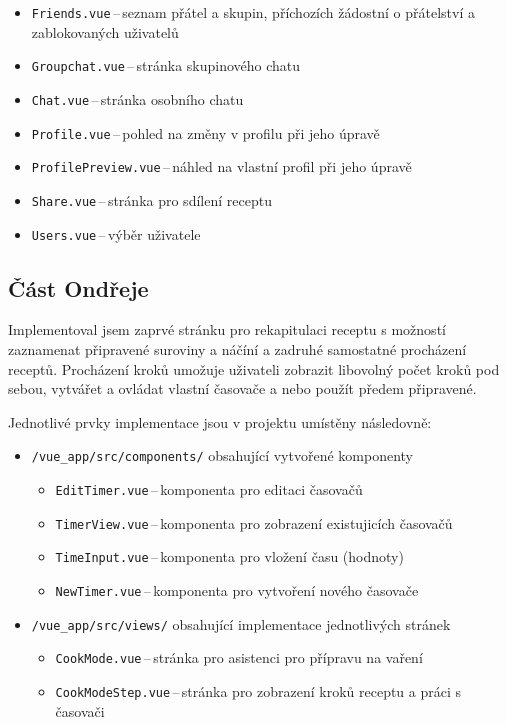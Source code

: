 \documentclass[a4paper, 11pt]{article}
\renewcommand{\t}[1]{\texttt{#1}} %
\begin{document}
\begin{itemize}
\begin{itemize}
            \item \t{Friends.vue}\,--\,seznam přátel a skupin, příchozích žádostní o přátelství a zablokovaných uživatelů
            \item \t{Groupchat.vue}\,--\,stránka skupinového chatu
            \item \t{Chat.vue}\,--\,stránka osobního chatu
            \item \t{Profile.vue}\,--\,pohled na změny v profilu při jeho úpravě
            \item \t{ProfilePreview.vue}\,--\,náhled na vlastní profil při jeho úpravě
            \item \t{Share.vue}\,--\,stránka pro sdílení receptu
            \item \t{Users.vue}\,--\,výběr uživatele
        \end{itemize}
\end{itemize}

\subsection{Část Ondřeje}

Implementoval jsem
	zaprvé stránku pro rekapitulaci receptu
		s možností zaznamenat připravené suroviny a náčíní
	a zadruhé samostatné procházení receptů.
Procházení kroků umožuje uživateli zobrazit libovolný počet kroků pod sebou,
	vytvářet a ovládat vlastní časovače a nebo použít předem připravené.

Jednotlivé prvky implementace jsou v projektu umístěny následovně:
\begin{itemize}
    \item \t{/vue\_app/src/components/} obsahující vytvořené komponenty
        \begin{itemize}
            \item \t{EditTimer.vue}\,--\,komponenta pro editaci časovačů
            \item \t{TimerView.vue}\,--\,komponenta pro zobrazení existujicích časovačů
			\item \t{TimeInput.vue}\,--\,komponenta pro vložení času (hodnoty)
            \item \t{NewTimer.vue}\,--\,komponenta pro vytvoření nového časovače
        \end{itemize}
    \item \t{/vue\_app/src/views/} obsahující implementace jednotlivých stránek
        \begin{itemize}
            \item \t{CookMode.vue}\,--\,stránka pro asistenci pro přípravu na vaření
            \item \t{CookModeStep.vue}\,--\,stránka pro zobrazení kroků receptu a práci s časovači
        \end{itemize}
\end{itemize}
\end{document}
